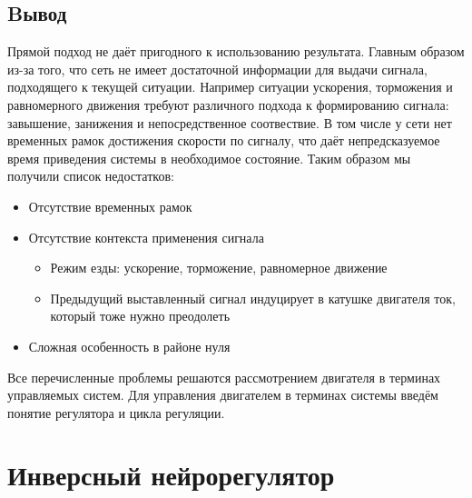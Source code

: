 \documentclass[14pt]{extreport}
\begin{document}
            \section{Bывод}
                Прямой подход не даёт пригодного к использованию результата. Главным образом из-за того, что сеть не имеет достаточной информации для выдачи сигнала, подходящего к текущей ситуации. Например ситуации ускорения, торможения и равномерного движения требуют различного подхода к формированию сигнала: завышение, занижения и непосредственное соотвествие. В том числе у сети нет временных рамок достижения скорости по сигналу, что даёт непредсказуемое время приведения системы в необходимое состояние. Таким образом мы получили список недостатков:
                \begin{itemize}
                  \item Отсутствие временных рамок
                  \item Отсутствие контекста применения сигнала
                      \begin{itemize}
                        \item Режим езды: ускорение, торможение, равномерное движение
                        \item Предыдущий выставленный сигнал индуцирует в катушке двигателя ток, который тоже нужно преодолеть
                      \end{itemize}
                  \item Сложная особенность в районе нуля
                \end{itemize}
                Все перечисленные проблемы решаются рассмотрением двигателя в терминах управляемых систем. Для управления двигателем в терминах системы введём понятие регулятора и цикла регуляции.
    \chapter{Инверсный нейрорегулятор}
\end{document}
